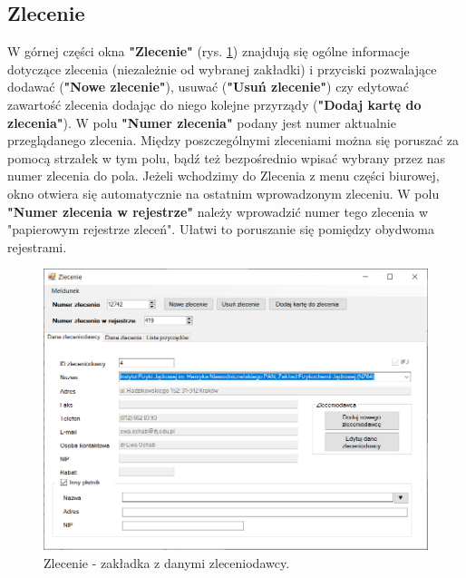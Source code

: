 \subsection{Zlecenie}
\label{zlecenie}

W górnej części okna \textbf{"Zlecenie"} (rys. \ref{zlecenieDaneZleceniodawcy}) znajdują się ogólne informacje dotyczące zlecenia (niezależnie od wybranej zakładki) i przyciski pozwalające dodawać (\textbf{"Nowe zlecenie"}), usuwać (\textbf{"Usuń zlecenie"}) czy edytować zawartość zlecenia dodając do niego kolejne przyrządy (\textbf{"Dodaj kartę do zlecenia"}). 
W polu \textbf{"Numer zlecenia"} podany jest numer aktualnie przeglądanego zlecenia. Między poszczególnymi zleceniami można się poruszać za pomocą strzałek w tym polu, bądź też bezpośrednio wpisać wybrany przez nas numer zlecenia do pola. Jeżeli wchodzimy do Zlecenia z menu części biurowej, okno otwiera się automatycznie na ostatnim wprowadzonym zleceniu.
W polu \textbf{"Numer zlecenia w rejestrze"} należy wprowadzić numer tego zlecenia w "papierowym rejestrze zleceń". Ułatwi to poruszanie się pomiędzy obydwoma rejestrami.
 
 \begin{figure}[htb]
 	\centering
 	\includegraphics[width=\columnwidth]{obrazki/Biuro/zlecenie/zlecenie_dane_zleceniodawcy.png}
 	\caption{Zlecenie - zakładka z danymi zleceniodawcy.}
 	\label{zlecenieDaneZleceniodawcy}
 \end{figure}
 
